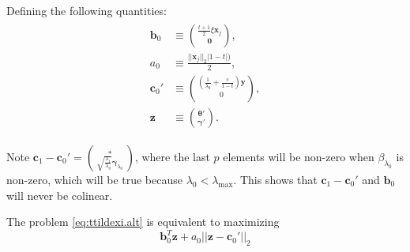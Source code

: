 Defining the following quantities:
\begin{gather}
    \begin{aligned}
        \boldsymbol b_0&\equiv\binom{\frac{t+1}{2}\xi \boldsymbol x_j}{\boldsymbol 0},\\
        a_0&\equiv\frac{||\boldsymbol x_j||_2|1-t|)}{2},\\
        \boldsymbol c_0'&\equiv\binom{\left(\frac{1}{\lambda_0}+\frac{c}{1-t}\right)\boldsymbol y}{0},\\
        \boldsymbol z &\equiv \binom{\boldsymbol\theta'}{\boldsymbol\gamma'}.
    \end{aligned}
\end{gather}

Note $\boldsymbol c_1-\boldsymbol c_0'=\binom{*}{\sqrt{\frac{\lambda_1}{\lambda_0}}\boldsymbol\gamma_{\lambda_0}}$, where the last $p$ elements will be non-zero when $\beta_{\lambda_0}$ is non-zero, which will be true because $\lambda_0<\lambda_{\max}$. This shows that $\boldsymbol c_1-\boldsymbol c_0'$ and $\boldsymbol b_0$ will never be colinear.

The problem \eqref{eq:ttildexi.alt} is equivalent to maximizing
\begin{equation}
    \label{eq:2.2.1}
    \boldsymbol b_0^T\boldsymbol z+a_0||\boldsymbol z-\boldsymbol c_0'||_2
\end{equation}

